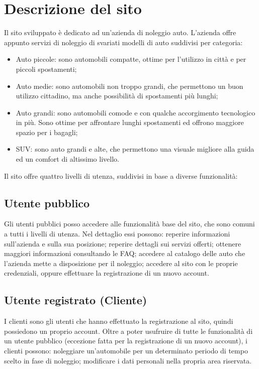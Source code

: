 \documentclass[12pt,a4paperS]{report}
\begin{document}
	\hypertarget{descrizione}{\chapter{Descrizione del sito}}
	\label{descrizione}
		\begin{normalsize}
			Il sito sviluppato è dedicato ad un'azienda di noleggio auto.
			L'azienda offre appunto servizi di noleggio di svariati modelli di auto suddivisi per categoria:
			\begin{itemize}
				\item Auto piccole: sono automobili compatte, ottime per l'utilizzo in città e per piccoli spostamenti;
				\item Auto medie: sono automobili non troppo grandi, che permettono un buon utilizzo cittadino, ma anche possibilità di spostamenti più lunghi;
				\item Auto grandi: sono automobili comode e con qualche accorgimento tecnologico in più. Sono ottime per affrontare lunghi spostamenti ed offrono maggiore spazio per i bagagli;
				\item SUV: sono auto grandi e alte, che permettono una visuale migliore alla guida ed un comfort di altissimo livello.
			\end{itemize}
			Il sito offre quattro livelli di utenza, suddivisi in base a diverse funzionalità:
			
			\section{Utente pubblico}
				Gli utenti pubblici posso accedere alle funzionalità base del sito, che sono comuni a tutti i livelli di utenza.
				\newline
				Nel dettaglio essi possono: reperire informazioni sull'azienda e sulla sua posizione; reperire dettagli sui servizi offerti; ottenere maggiori informazioni consultando le FAQ; accedere al catalogo delle auto che l'azienda mette a disposizione per il noleggio; accedere al sito con le proprie credenziali, oppure effettuare la registrazione di un nuovo account.
				
			\section{Utente registrato (Cliente)}
				I clienti sono gli utenti che hanno effettuato la registrazione al sito, quindi possiedono un proprio account.
				\newline
				Oltre a poter usufruire di tutte le funzionalità di un utente pubblico (eccezione fatta per la registrazione di un nuovo account), i clienti possono: noleggiare un'automobile per un determinato periodo di tempo scelto in fase di noleggio; modificare i dati personali nella propria area riservata.
			

\end{normalsize}
\end{document}
